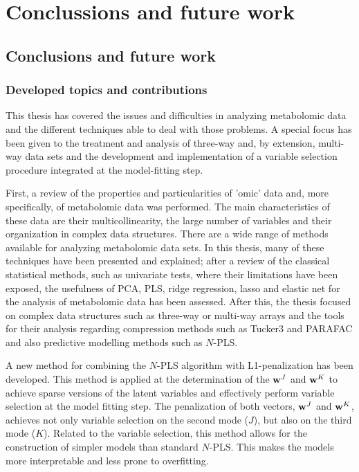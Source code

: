 \part{Conclussions and future work}
\chapter[Conclusions]{Conclusions and future work}

\section{Developed topics and contributions}
This thesis has covered the issues and difficulties in analyzing metabolomic data and the different techniques able to deal with those problems. A special focus has been given to the treatment and analysis of three-way and, by extension, multi-way data sets and the development and implementation of a variable selection procedure integrated at the model-fitting step.

First, a review of the properties and particularities of 'omic' data and, more specifically, of metabolomic data was performed. The main characteristics of these data are their multicollinearity, the large number of variables and their organization in complex data structures. There are a wide range of methods available for analyzing metabolomic data sets. In this thesis, many of these techniques have been presented and explained; after a review of the classical statistical methods, such as univariate tests, where their limitations have been exposed, the usefulness of PCA, PLS, ridge regression, lasso and elastic net for the analysis of metabolomic data has been assessed. After this, the thesis focused on complex data structures such as three-way or multi-way arrays and the tools for their analysis regarding compression methods such as Tucker3 and PARAFAC and also predictive modelling methods such as $N$-PLS.

A new method for combining the $N$-PLS algorithm with L1-penalization has been developed. This method is applied at the determination of the $\textbf{\text{w}}^J$ and $\textbf{\text{w}}^K$ to achieve sparse versions of the latent variables and effectively perform variable selection at the model fitting step. The penalization of both vectors, $\textbf{\text{w}}^J$ and $\textbf{\text{w}}^K$, achieves not only variable selection on the second mode ($J$), but also on the third mode ($K$). Related to the variable selection, this method allows for the construction of simpler models than standard $N$-PLS. This makes the models more interpretable and less prone to overfitting.

